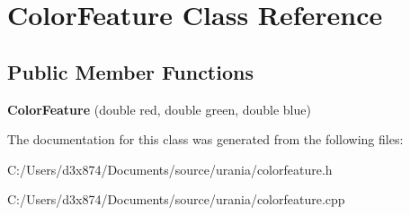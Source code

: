 \hypertarget{class_color_feature}{\section{\-Color\-Feature \-Class \-Reference}
\label{class_color_feature}
}
\subsection*{\-Public \-Member \-Functions}
\begin{DoxyCompactItemize}
\item 
\hypertarget{class_color_feature_a92a4e970e61c6222a748790456a1142f}{{\bfseries \-Color\-Feature} (double red, double green, double blue)}\label{class_color_feature_a92a4e970e61c6222a748790456a1142f}

\end{DoxyCompactItemize}


\-The documentation for this class was generated from the following files\-:\begin{DoxyCompactItemize}
\item 
\-C\-:/\-Users/d3x874/\-Documents/source/urania/colorfeature.\-h\item 
\-C\-:/\-Users/d3x874/\-Documents/source/urania/colorfeature.\-cpp\end{DoxyCompactItemize}
